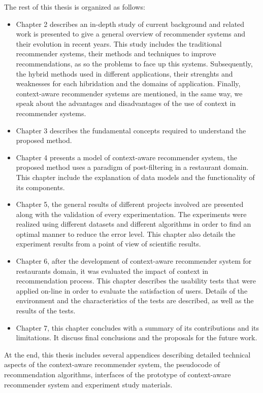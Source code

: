 The rest of this thesis is organized as follows: 
\begin{itemize}  
\item Chapter 2 describes an in-depth study of current background and
related work is presented to give a general overview of recommender
systems and their evolution in recent years. This study includes the
traditional recommender systems, their methods and techniques to
improve recommendations, as so the problems to face up this systems.
Subsequently, the hybrid methods used in different applications, their
strenghts and weaknesses for each hibridation and the domains of
application. Finally, context-aware recommender systems are mentioned,
in the same way, we speak about the advantages and disadvantages of
the use of context in recommender systems.
\item Chapter 3 describes the fundamental concepts required to
understand the proposed method.
\item Chapter 4 presents a model of context-aware recommender system,
the proposed method  uses a paradigm of post-filtering in a restaurant
domain. This chapter include the explanation of data models and the
functionality of its components.
\item Chapter 5, the general results of different projects involved
are presented along with the validation of every experimentation. The
experiments were realized using different datasets and different
algorithms in order to find an optimal manner to reduce the error
level. This chapter also details the experiment results from a point
of view  of scientific results.
\item Chapter 6, after the development of context-aware recommender
system for restaurants domain, it was evaluated the impact of context
in recommendation process. This chapter describes the usability tests
that were applied on-line in order to evaluate the satisfaction of
users. Details of the environment and the characteristics of the tests
are described, as well as the results of the tests.
\item Chapter 7, this chapter concludes with a
summary of its contributions and  its limitations. It discuss final
conclusions and the proposals for the future work.
\end{itemize}  
At the end, this thesis includes several appendices describing
detailed technical aspects of the context-aware recommender system,
the pseudocode of recommendation algorithms, interfaces of the
prototype of context-aware recommender system and experiment study
materials.



